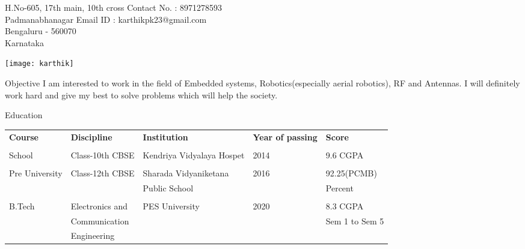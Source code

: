 \documentclass{resume} %
\begin{document}
\begin{rSection}{ }

H.No-605, 17th main, 10th cross \hfill  Contact No. : 8971278593 \\
Padmanabhanagar  \hfill Email ID : karthikpk23@gmail.com \\
Bengaluru - 560070\\
Karnataka\\
\end{rSection}

\begin{center}
\hspace{10 cm}
\texttt{[image: karthik]}
\end{center}

\vskip 0.5in

\begin{rSection}{Objective}
 I am interested to work in the field of Embedded systems, Robotics(especially aerial robotics), RF and Antennas. I will definitely work hard and give my best to solve problems which will help the society.
\end{rSection}

\vskip 0.5in

\begin{rSection}{Education}
\centering
\begin{tabular}{|l|l|l|l|l|}
\hline
{\bf Course} & {\bf Discipline} & {\bf Institution} & {\bf Year of passing} & {\bf Score} \\
&&&&\\
\hline
 School & Class-10th CBSE & Kendriya Vidyalaya Hospet & 2014 & 9.6 CGPA\\
 &&&&\\
 \hline
 Pre University & Class-12th CBSE & Sharada Vidyaniketana & 2016 & 92.25(PCMB)\\
  & & Public School & &Percent\\
  &&&&\\
  \hline
  B.Tech & Electronics and & PES University & 2020 & 8.3 CGPA\\
  &Communication&&&Sem 1 to Sem 5\\
  & Engineering&&&\\
  \hline
\end{tabular}
\end{rSection}

\pagebreak
\end{document}
